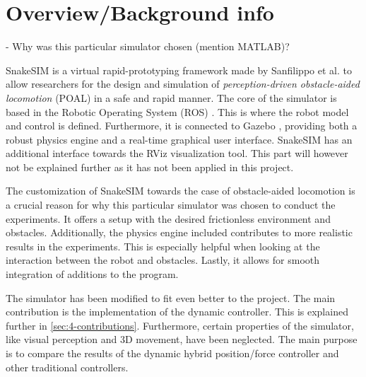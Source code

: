 \section{Overview/Background info}

- Why was this particular simulator chosen (mention MATLAB)?

SnakeSIM is a virtual rapid-prototyping framework made by Sanfilippo et al. \cite{sanfilippo2018snakesim} to allow researchers for the design and simulation of \textit{perception-driven obstacle-aided locomotion} (POAL) in a safe and rapid manner. The core of the simulator is based in the Robotic Operating System (ROS) \cite{quigley2009ros}. This is where the robot model and control is defined. Furthermore, it is connected to Gazebo \cite{koenig2004design}, providing both a robust physics engine and a real-time graphical user interface. SnakeSIM has an additional interface towards the RViz visualization tool. This part will however not be explained further as it has not been applied in this project.

The customization of SnakeSIM towards the case of obstacle-aided locomotion is a crucial reason for why this particular simulator was chosen to conduct the experiments. It offers a setup with the desired frictionless environment and obstacles. Additionally, the physics engine included contributes to more realistic results in the experiments. This is especially helpful when looking at the interaction between the robot and obstacles. Lastly, it allows for smooth integration of additions to the program.

The simulator has been modified to fit even better to the project. The main contribution is the implementation of the dynamic controller. This is explained further in \ref{sec:4-contributions}. Furthermore, certain properties of the simulator, like visual perception and 3D movement, have been neglected. The main purpose is to compare the results of the dynamic hybrid position/force controller and other traditional controllers. 